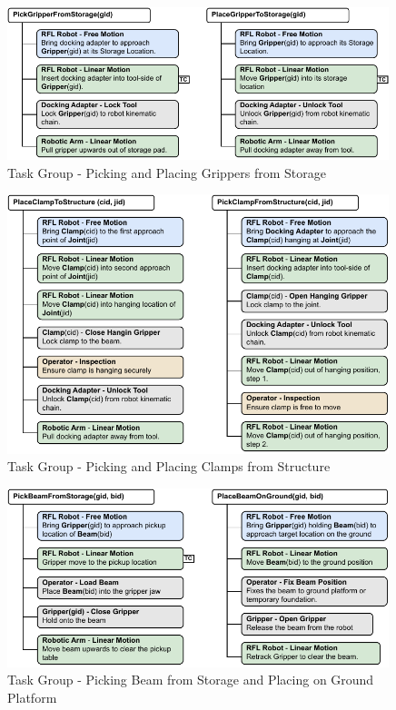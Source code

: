 \begin{figure}[!p]
    \centering
    \includegraphics[width=0.99\textwidth]{images/6a/lowleveltask-2.pdf}
    \caption{Task Group - Picking and Placing Grippers from Storage}
    \label{fig:task-group-2}
\end{figure}

\begin{figure}[!p]
    \centering
    \includegraphics[width=0.99\textwidth]{images/6a/lowleveltask-3.pdf}
    \caption{Task Group - Picking and Placing Clamps from Structure}
    \label{fig:task-group-3}
\end{figure}

\begin{figure}[!p]
    \centering
    \includegraphics[width=0.99\textwidth]{images/6a/lowleveltask-4.pdf}
    \caption{Task Group - Picking Beam from Storage and Placing on Ground Platform}
    \label{fig:task-group-4}
\end{figure}


